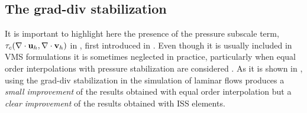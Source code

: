 
\subsection{The grad-div stabilization}
\label{subsec-C5_pressure_subscale}
It is important to highlight here the presence of the pressure subscale term, $\tau_c(\nabla\cdot{\bf u}_h,\nabla\cdot{\bf v}_h)$ in , first introduced in \cite{franca_two_1988}. Even though it is usually included in VMS formulations it is sometimes neglected in practice, particularly when equal order interpolations with pressure stabilization are considered \cite{colomes_assessment_2015}. As it is shown in \cite{g_lube_local_2008}, using the grad-div stabilization in the simulation of laminar flows produces a \textit{small improvement} of the results obtained with equal order interpolation but a \textit{clear improvement} of the results obtained with ISS elements.


